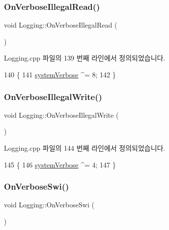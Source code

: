 \subsubsection{\texorpdfstring{On\+Verbose\+Illegal\+Read()}{OnVerboseIllegalRead()}}
{\footnotesize\ttfamily void Logging\+::\+On\+Verbose\+Illegal\+Read (\begin{DoxyParamCaption}{ }\end{DoxyParamCaption})\hspace{0.3cm}{\ttfamily [protected]}}



Logging.\+cpp 파일의 139 번째 라인에서 정의되었습니다.


\begin{DoxyCode}
140 \{
141   \mbox{\hyperlink{system_8cpp_a67739df6b2271a8b807f01c50a610478}{systemVerbose}} ^= 8;
142 \}
\end{DoxyCode}
\mbox{\label{class_logging_a16b403f45f3ac4191d65a09ed76b71ea}} 
\subsubsection{\texorpdfstring{On\+Verbose\+Illegal\+Write()}{OnVerboseIllegalWrite()}}
{\footnotesize\ttfamily void Logging\+::\+On\+Verbose\+Illegal\+Write (\begin{DoxyParamCaption}{ }\end{DoxyParamCaption})\hspace{0.3cm}{\ttfamily [protected]}}



Logging.\+cpp 파일의 144 번째 라인에서 정의되었습니다.


\begin{DoxyCode}
145 \{
146   \mbox{\hyperlink{system_8cpp_a67739df6b2271a8b807f01c50a610478}{systemVerbose}} ^= 4;
147 \}
\end{DoxyCode}
\mbox{\label{class_logging_a259d3e7d18156282e39c7f8594c03c92}} 
\subsubsection{\texorpdfstring{On\+Verbose\+Swi()}{OnVerboseSwi()}}
{\footnotesize\ttfamily void Logging\+::\+On\+Verbose\+Swi (\begin{DoxyParamCaption}{ }\end{DoxyParamCaption})\hspace{0.3cm}{\ttfamily [protected]}}



